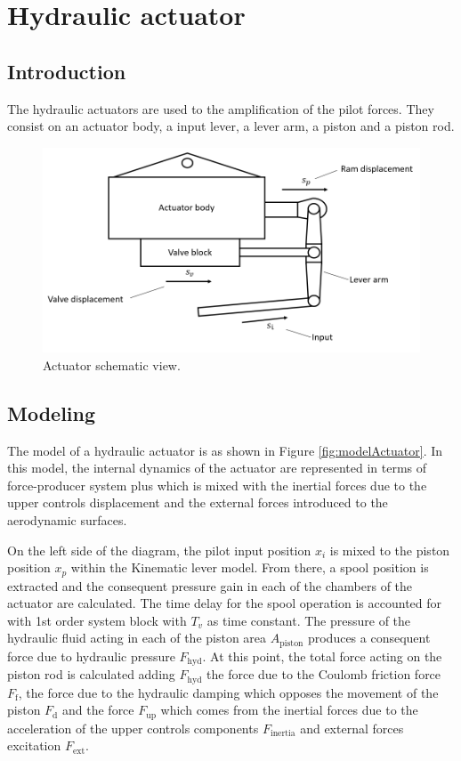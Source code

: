 \section{Hydraulic actuator}

\subsection{Introduction}

  The hydraulic actuators are used to the amplification of the pilot forces. They consist on an actuator body, a input lever, a lever arm, a piston and a piston rod. 
  \begin{figure}[!htpb]
    \centering
    \includegraphics[width=0.7 \textwidth]{figures/diagramActuator}
    \caption[Actuator schematic view]{Actuator schematic view.}
    \label{fig:diagramActuator}
  \end{figure}

\subsection{Modeling}

  The model of a hydraulic actuator is as shown in Figure \ref{fig:modelActuator}. In this model, the internal dynamics of the actuator are represented in terms of force-producer system plus which is mixed with the inertial forces due to the upper controls displacement and the external forces introduced to the aerodynamic surfaces.

  On the left side of the diagram, the pilot input position $x_i$ is mixed to the piston position $x_p$ within the Kinematic lever model. From there, a spool position is extracted and the consequent pressure gain in each of the chambers of the actuator are calculated. The time delay for the spool operation is accounted for with 1st order system block with $T_v$ as time constant. The pressure of the hydraulic fluid acting in each of the piston area $A_{\mathrm{piston}}$ produces a consequent force due to hydraulic pressure $F_{\mathrm{hyd}}$. At this point, the total force acting on the piston rod is calculated adding $F_{\mathrm{hyd}}$ the force due to the Coulomb friction force $F_{\mathrm{f}}$, the force due to the hydraulic damping which opposes the movement of the piston $F_{\mathrm{d}}$ and the force $F_{\mathrm{up}}$ which comes from the inertial forces due to the acceleration of the upper controls components $F_{\mathrm{inertia}}$ and external forces excitation $F_{\mathrm{ext}}$. 


